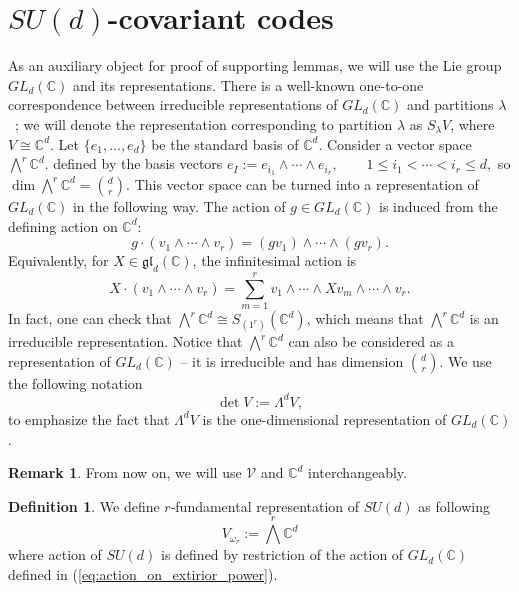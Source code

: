 \documentclass[11pt,letterpaper]{article}
\theoremstyle{plain}
\theoremstyle{plain}
\theoremstyle{plain}
\theoremstyle{plain}
\theoremstyle{plain}
\theoremstyle{plain}
\newcommand{\C}{\mathbb{C}}
\theoremstyle{plain}
\theoremstyle{definition}
\newtheorem{smdefinition}[smtheorem]{Definition}
\newtheorem{smremark}[smtheorem]{Remark}
\theoremstyle{plain}
\begin{document}
\section{\texorpdfstring{$SU(d)$}{SU(d)}-covariant codes}\label{sec:supple_sud}

As an auxiliary object for proof of supporting lemmas, we will use the Lie group $GL_d(\mathbb{C})$ and its representations. 
There is a well-known one-to-one correspondence between irreducible representations of $GL_d(\mathbb{C})$ and partitions $\lambda$~\cite{FultonHarris1991}; we will
denote the representation corresponding to partition $\lambda$ as $S_\lambda V$, where $V\cong \mathbb{C}^d$.
Let \(\{e_1,\ldots,e_d\}\) be the standard basis of \(\mathbb C^d\). Consider a vector space
$
    \bigwedge^r \mathbb C^d.
$
defined by the basis vectors
$
    e_I:=e_{i_1}\wedge\cdots\wedge e_{i_r},
    \qquad
    1\le i_1<\cdots<i_r\le d,
$
so $\dim \bigwedge^r \mathbb C^d=\binom dr$. This vector space can be turned into a representation of $GL_d(\mathbb{C})$ in the following way.
The action of \(g\in GL_d(\mathbb{C})\) is induced from the defining action on
\(\mathbb C^d\):
\begin{equation}\label{eq:action_on_extirior_power}
    g\cdot(v_1\wedge\cdots\wedge v_r)
    =
    (gv_1)\wedge\cdots\wedge(gv_r).
\end{equation}
Equivalently, for \(X\in\mathfrak{gl}_d(\mathbb{C})\), the infinitesimal action is
\[
    X\cdot(v_1\wedge\cdots\wedge v_r)
    =
    \sum_{m=1}^r
    v_1\wedge\cdots\wedge Xv_m\wedge\cdots\wedge v_r.
\]
In fact, one can check that $\bigwedge^r \mathbb C^d\cong S_{\left(1^r\right)}\left(\mathbb{C}^d\right)$, 
which means that $\bigwedge^r \mathbb C^d$ is an irreducible representation.
Notice that $\bigwedge^r \mathbb C^d$ can also be considered as a representation of $GL_d(\mathbb{C})$ -- it is irreducible and has dimension $\binom{d}{r}$.
We use the following notation
\[
    \operatorname{det} V:=\Lambda^d V,
\]
to emphasize the fact that $\Lambda^d V$ is the one-dimensional representation of $GL_d(\mathbb{C})$.

\begin{smremark}
    From now on, we will use $\mathcal{V}$ and $\C^d$ interchangeably.
\end{smremark}

\begin{smdefinition}\label{def:rfundSUd}
    We define $r$-fundamental representation of $SU(d)$ as following
    \[
        V_{\omega_r}:=\bigwedge^r \mathbb C^d
    \]
    where action of $SU(d)$ is defined by restriction of the action of $GL_d(\mathbb{C})$ defined in (\ref{eq:action_on_extirior_power}).
\end{smdefinition}
\end{document}
